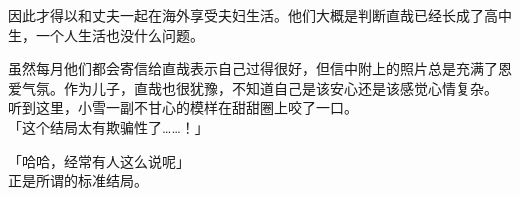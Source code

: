 因此才得以和丈夫一起在海外享受夫妇生活。他们大概是判断直哉已经长成了高中生，一个人生活也没什么问题。

虽然每月他们都会寄信给直哉表示自己过得很好，但信中附上的照片总是充满了恩爱气氛。作为儿子，直哉也很犹豫，不知道自己是该安心还是该感觉心情复杂。\\

听到这里，小雪一副不甘心的模样在甜甜圈上咬了一口。\\

「这个结局太有欺骗性了……！」

「哈哈，经常有人这么说呢」\\

正是所谓的标准结局。
